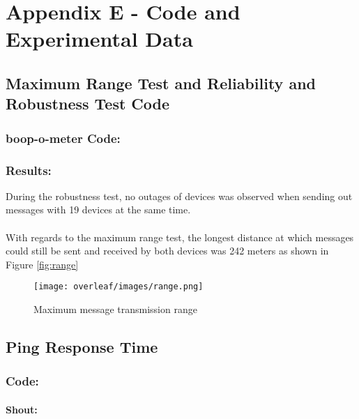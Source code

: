\cleardoublepage%
\chapter*{\label{chap:apx_e}Appendix E - Code and Experimental Data}%
%

\section*{Maximum Range Test and Reliability and Robustness Test Code}
\subsection*{boop-o-meter Code:}

\subsection*{Results:}

During the robustness test, no outages of devices was observed when sending out messages with 19 devices at the same time. \\\\
With regards to the maximum range test, the longest distance at which messages could still be sent and received by both devices was 242 meters as shown in Figure \ref{fig:range}

\begin{figure}
    \centering
    \texttt{[image: overleaf/images/range.png]}
    \vspace{\ftspace}
    \caption{Maximum message transmission range}
    \label{fig:apx:range}
\end{figure}

\section*{Ping Response Time}
\subsection*{Code:}
\subsubsection*{Shout:}

